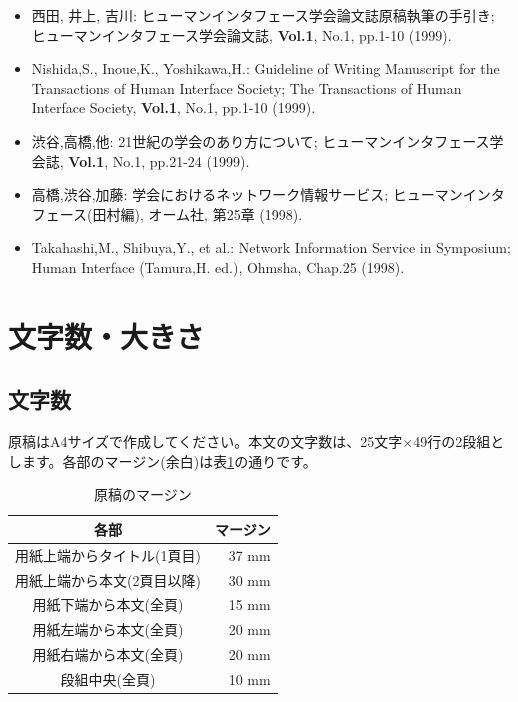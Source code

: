 \documentclass{hissymp}
\begin{document}
	{\small
	\begin{itemize}
	\item[{[1]}]
		西田, 井上, 吉川:
		ヒューマンインタフェース学会論文誌原稿執筆の手引き;
		ヒューマンインタフェース学会論文誌,
		{\bf Vol.1}, No.1, pp.1-10 (1999).
	\item[{[2]}]
		Nishida,S., Inoue,K., Yoshikawa,H.:
		Guideline of Writing Manuscript for the Transactions of Human Interface Society;
		The Transactions of Human Interface Society,
		{\bf Vol.1}, No.1, pp.1-10 (1999).
	\item[{[3]}]
		渋谷,高橋,他:
		21世紀の学会のあり方について;
		ヒューマンインタフェース学会誌,
		{\bf Vol.1}, No.1, pp.21-24 (1999).
	\item[{[4]}]
		高橋,渋谷,加藤:
		学会におけるネットワーク情報サービス;
		ヒューマンインタフェース(田村編),
		オーム社, 第25章 (1998).
	\item[{[5]}]
		Takahashi,M., Shibuya,Y., et al.:
		Network Information Service in Symposium;
		Human Interface (Tamura,H. ed.),
		Ohmsha, Chap.25 (1998).
	\end{itemize}}


\section{文字数・大きさ}

\subsection{文字数}
原稿はA4サイズで作成してください。本文の文字数は、25文字×49行の2段組とします。各部のマージン(余白)は表\ref{table:margin}の通りです。

\begin{table}[bt]
	\begin{center}
	\caption{原稿のマージン}		%
	\label{table:margin}
	\begin{tabular}[hbt]{c r}
	\hline
	\bf 各部 & \bf マージン\\
	\hline
	用紙上端からタイトル(1頁目) & 37 mm\\
	用紙上端から本文(2頁目以降) & 30 mm\\
	用紙下端から本文(全頁) & 15 mm\\
	用紙左端から本文(全頁) & 20 mm\\
	用紙右端から本文(全頁) & 20 mm\\
	段組中央(全頁) & 10 mm\\
	\hline
	\end{tabular}
	\end{center}
\end{table}
\end{document}
